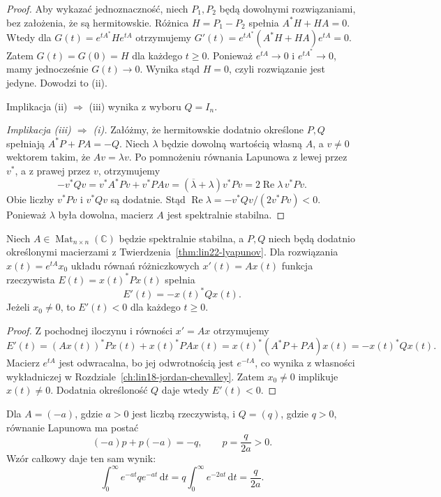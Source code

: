 \begin{proof}
Aby wykazać jednoznaczność,
niech \(P_1,P_2\) będą dowolnymi
rozwiązaniami, bez założenia,
że są hermitowskie.
Różnica \(H=P_1-P_2\)
spełnia \(A^*H+HA=0\).
Wtedy dla
\(G(t)=e^{tA^*}He^{tA}\)
otrzymujemy
\(G'(t)=e^{tA^*}(A^*H+HA)e^{tA}=0\).
Zatem \(G(t)=G(0)=H\)
dla każdego \(t\ge0\).
Ponieważ \(e^{tA}\to0\)
i \(e^{tA^*}\to0\),
mamy jednocześnie \(G(t)\to0\).
Wynika stąd \(H=0\),
czyli rozwiązanie jest jedyne.
Dowodzi to (ii).

Implikacja (ii) \(\Rightarrow\) (iii)
wynika z wyboru \(Q=I_n\).

\emph{Implikacja (iii) \(\Rightarrow\) (i).}
Załóżmy, że hermitowskie
dodatnio określone \(P,Q\)
spełniają \(A^*P+PA=-Q\).
Niech \(\lambda\) będzie dowolną
wartością własną \(A\),
a \(v\ne0\) wektorem takim,
że \(Av=\lambda v\).
Po pomnożeniu równania Lapunowa
z lewej przez \(v^*\),
a z prawej przez \(v\),
otrzymujemy
\[
 -v^*Qv
 =v^*A^*Pv+v^*PAv
 =(\overline\lambda+\lambda)v^*Pv
 =2\operatorname{Re}\lambda\,v^*Pv.
\]
Obie liczby \(v^*Pv\)
i \(v^*Qv\) są dodatnie.
Stąd
\(\operatorname{Re}\lambda
 =-v^*Qv/(2v^*Pv)<0\).
Ponieważ \(\lambda\) była dowolna,
macierz \(A\) jest spektralnie stabilna.
\end{proof}

\begin{wniosek}
\label{cor:lin22-energy}
Niech \(A\in\operatorname{Mat}_{n\times n}(\mathbb C)\)
będzie spektralnie stabilna,
a \(P,Q\) niech będą dodatnio
określonymi macierzami z
Twierdzenia~\ref{thm:lin22-lyapunov}.
Dla rozwiązania
\(x(t)=e^{tA}x_0\)
układu równań różniczkowych
\(x'(t)=Ax(t)\)
funkcja rzeczywista
\(E(t)=x(t)^*Px(t)\)
spełnia
\[
 E'(t)=-x(t)^*Qx(t).
\]
Jeżeli \(x_0\ne0\),
to \(E'(t)<0\)
dla każdego \(t\ge0\).
\end{wniosek}
\begin{proof}
Z pochodnej iloczynu
i równości \(x'=Ax\)
otrzymujemy
\[
 E'(t)
 =(Ax(t))^*Px(t)+x(t)^*PAx(t)
 =x(t)^*(A^*P+PA)x(t)
 =-x(t)^*Qx(t).
\]
Macierz \(e^{tA}\) jest odwracalna,
bo jej odwrotnością jest \(e^{-tA}\),
co wynika z własności wykładniczej
w Rozdziale~\ref{ch:lin18-jordan-chevalley}.
Zatem \(x_0\ne0\)
implikuje \(x(t)\ne0\).
Dodatnia określoność \(Q\)
daje wtedy \(E'(t)<0\).
\end{proof}

\begin{przyklad}
\label{prz:lin22-scalar}
Dla \(A=(-a)\), gdzie \(a>0\)
jest liczbą rzeczywistą,
i \(Q=(q)\), gdzie \(q>0\),
równanie Lapunowa ma postać
\[
 (-a)p+p(-a)=-q,
 \qquad p=\frac{q}{2a}>0.
\]
Wzór całkowy daje ten sam wynik:
\[
 \int_0^\infty e^{-at}q e^{-at}\,\mathrm dt
 =q\int_0^\infty e^{-2at}\,\mathrm dt
 =\frac q{2a}.
\]
\end{przyklad}

